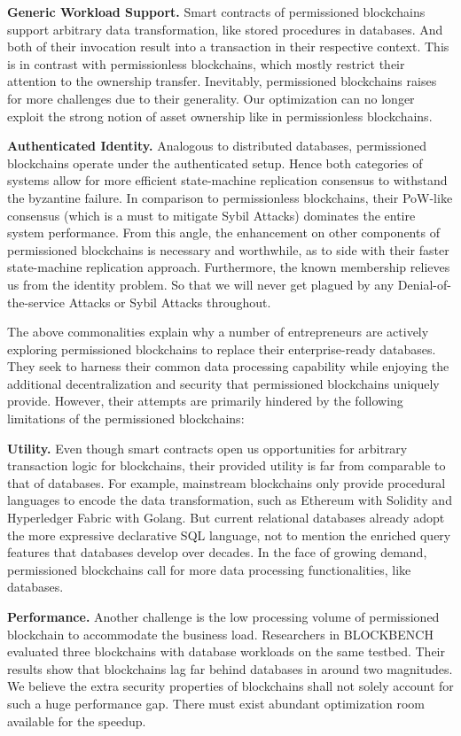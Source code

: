 \textbf{Generic Workload Support. } 
Smart contracts of permissioned blockchains support arbitrary data transformation, like stored procedures in databases. And both of their invocation result into a transaction in their respective context. 
This is in contrast with permissionless blockchains, which mostly restrict their attention to the ownership transfer. 
Inevitably, permissioned blockchains raises for more challenges due to their generality.
Our optimization can no longer exploit the strong notion of asset ownership like in permissionless blockchains. 

\textbf{Authenticated Identity. } 
Analogous to distributed databases, permissioned blockchains operate under the authenticated setup.
Hence both categories of systems allow for more efficient state-machine replication consensus to withstand the byzantine failure. 
In comparison to permissionless blockchains, their PoW-like consensus (which is a must to mitigate Sybil Attacks) dominates the entire system performance. 
From this angle, the enhancement on other components of permissioned blockchains is necessary and worthwhile, as to side with their faster state-machine replication approach. 
Furthermore, the known membership relieves us from the identity problem. 
So that we will never get plagued by any Denial-of-the-service Attacks or Sybil Attacks throughout. 

The above commonalities explain why a number of entrepreneurs are actively exploring permissioned blockchains to replace their enterprise-ready databases. 
They seek to harness their common data processing capability while enjoying the additional decentralization and security that permissioned blockchains uniquely provide. 
However, their attempts are primarily hindered by the following limitations of the permissioned blockchains:

\textbf{Utility. }
Even though smart contracts open us opportunities for arbitrary transaction logic for blockchains, their provided utility is far from comparable to that of databases. 
For example, mainstream blockchains only provide procedural languages to encode the data transformation, such as Ethereum with Solidity and Hyperledger Fabric with Golang. 
But current relational databases already adopt the more expressive declarative SQL language, not to mention the enriched query features that databases develop over decades. 
In the face of growing demand, permissioned blockchains call for more data processing functionalities, like databases. 

\textbf{Performance. }
Another challenge is the low processing volume of permissioned blockchain to accommodate the business load. 
Researchers in BLOCKBENCH evaluated three blockchains with database workloads on the same testbed. 
Their results show that blockchains lag far behind databases in around two magnitudes. 
We believe the extra security properties of blockchains shall not solely account for such a huge performance gap. 
There must exist abundant optimization room available for the speedup. 

